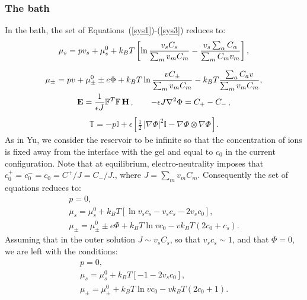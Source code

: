 \subsubsection{The bath}
In the bath, the set of Equations~(\ref{sys1})-(\ref{sys3}) reduces to:
\begin{gather}
\mu_s = p v_s + \mu_s^0 + k_BT\left[\ln \frac{v_s C_s}{\sum_m v_mC_m} - \frac{v_s \sum_\alpha C_\alpha}{\sum_m C_m v_m} \right],\\[2.5mm]
\mu_\pm = p v + \mu^0_\pm \pm e\Phi + k_BT \ln \frac{vC_\pm}{\sum_m v_m C_m} - k_BT \frac{\sum_a C_a v}{\sum_m v_m C_m},\\
\mathbf{E} = \frac{1}{\epsilon J} \mathbb{F}^T \mathbb{F}\, \mathbf{H}\, , \qquad -\epsilon J \nabla^2 \Phi = C_+-C_-\, ,
\end{gather}
\begin{gather}
\mathbb{T}= -p \mathbb{I} + \epsilon \left[\frac{1}{2} \,|\nabla \Phi|^2\mathbb{I} -\nabla \Phi \otimes \nabla \Phi\right].
\end{gather} 
As in Yu, we consider the reservoir to be infinite so that the concentration of ions is fixed away from the interface with the gel and equal to $c_0$ in the current configuration. Note that at equilibrium, electro-neutrality imposes that $c_0^+=c_0^-=c_0=C^+/J=C_-/J.$, where $J=\sum_m v_m C_m$. Consequently the set of equations reduces to:
\begin{gather}
p=0,\\
\mu_s = \mu_s^0 + k_BT\left[\ln v_s c_s - v_s c_s -2v_sc_0 \right],\\
\mu_\pm =\mu^0_\pm \pm e\Phi + k_BT \ln v c_0 - v k_BT (2c_0+c_s).
\end{gather} 
Assuming that in the outer solution $J\sim v_s C_s$, so that $v_s c_s\sim 1$, and that $\Phi=0$, we are left with the conditions:
\begin{gather}
p=0,\\
\mu_s = \mu_s^0 + k_BT\left[-1 -2v_sc_0 \right],\\
\mu_\pm =\mu^0_\pm + k_BT \ln v c_0 - v k_BT (2c_0+1).
\end{gather} 
